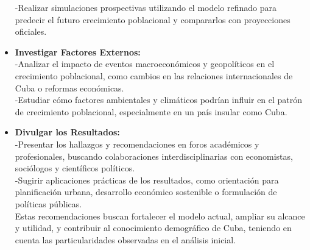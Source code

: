 \documentclass[a4paper,10pt,twocolumn]{article}
\begin{document}
\begin{itemize}
-Realizar simulaciones prospectivas utilizando el modelo refinado para predecir el futuro crecimiento poblacional y compararlos con proyecciones oficiales.
	\item \textbf{Investigar Factores Externos:}\\ 
-Analizar el impacto de eventos macroeconómicos y geopolíticos en el crecimiento poblacional, como cambios en las relaciones internacionales de Cuba o reformas económicas.\\
-Estudiar cómo factores ambientales y climáticos podrían influir en el patrón de crecimiento poblacional, especialmente en un país insular como Cuba.
	\item \textbf{Divulgar los Resultados:}\\
-Presentar los hallazgos y recomendaciones en foros académicos y profesionales, buscando colaboraciones interdisciplinarias con economistas, sociólogos y científicos políticos.\\
-Sugirir aplicaciones prácticas de los resultados, como orientación para planificación urbana, desarrollo económico sostenible o formulación de políticas públicas.\\
Estas recomendaciones buscan fortalecer el modelo actual, ampliar su alcance y utilidad, y contribuir al conocimiento demográfico de Cuba, teniendo en cuenta las particularidades observadas en el análisis inicial.
\end{itemize}


\end{document}
